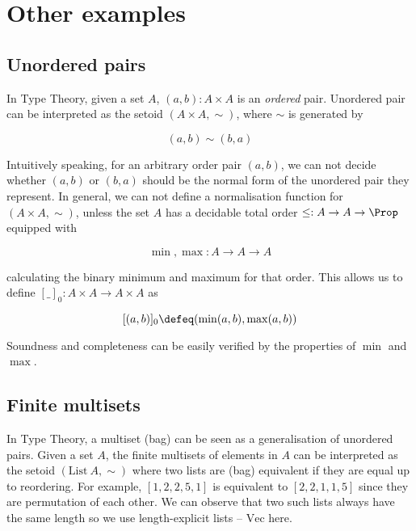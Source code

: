 \section{Other examples}

\subsection{Unordered pairs}

In Type Theory, given a set $A$, $(a, b) : A \times A$ is an \emph{ordered} pair. Unordered pair can be interpreted as the setoid $(A \times A, \sim)$, where $\sim$ is generated by %

$$(a,b)\sim(b,a)$$


Intuitively speaking, for an arbitrary order pair $(a,b)$, we can not decide whether $(a,b)$ or $(b,a)$ should be the normal form of the unordered pair they represent. In general, we can not define a normalisation function for $(A \times A, \sim)$, unless the set $A$ has a decidable total order $\leq : A \to A \to \Prop$ equipped with


$$\min, \max : A \to A \to A$$

calculating the binary minimum and maximum for that order. This allows us to
define $[\_]_0 : A \times A \to A \times A$ as

$$[(a,b)]_0 \defeq (\min(a,b),\max(a,b))$$

Soundness and completeness can be easily verified by the properties of $\min$ and $\max$.

\subsection{Finite multisets}



In Type Theory, a multiset (bag) can be seen as a generalisation of unordered pairs. Given a set $A$, the finite multisets of elements in $A$ can be interpreted as the setoid $(\text{List}~ A , \sim)$ where two lists are (bag) equivalent \cite{DBLP:conf/itp/Danielsson12} if they are equal up to reordering. For example, $[1, 2 , 2, 5 ,1]$ is equivalent to
$[2,2,1,1,5]$ since they are permutation of each other. We can observe that two such lists always have the same length so we use length-explicit lists -- $\text{Vec}$ here.

